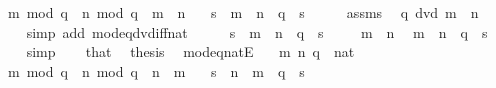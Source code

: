 \begin{isabellebody}
\ \ \ {\isachardoublequoteopen}m\ mod\ q\ {\isacharequal}{\kern0pt}\ n\ mod\ q{\isachardoublequoteclose}\ \ {\isachardoublequoteopen}m\ {\isasymge}\ n{\isachardoublequoteclose}\isanewline
\ \ \ s\ \ {\isachardoublequoteopen}m\ {\isacharequal}{\kern0pt}\ n\ {\isacharplus}{\kern0pt}\ q\ {\isacharasterisk}{\kern0pt}\ s{\isachardoublequoteclose}\isanewline
%
\isadelimproof
%
\endisadelimproof
%
\isatagproof
{}\isamarkupfalse%
\ {\isacharminus}{\kern0pt}\isanewline
\ \ \isamarkupfalse%
\ assms\ \isamarkupfalse%
\ {\isachardoublequoteopen}q\ dvd\ m\ {\isacharminus}{\kern0pt}\ n{\isachardoublequoteclose}\isanewline
\ \ \ \ \isamarkupfalse%
\ {\isacharparenleft}{\kern0pt}simp\ add{\isacharcolon}{\kern0pt}\ mod{\isacharunderscore}{\kern0pt}eq{\isacharunderscore}{\kern0pt}dvd{\isacharunderscore}{\kern0pt}iff{\isacharunderscore}{\kern0pt}nat{\isacharparenright}{\kern0pt}\isanewline
\ \ \isamarkupfalse%
\ \isamarkupfalse%
\ s\ \ {\isachardoublequoteopen}m\ {\isacharminus}{\kern0pt}\ n\ {\isacharequal}{\kern0pt}\ q\ {\isacharasterisk}{\kern0pt}\ s{\isachardoublequoteclose}\ \isacommand{{\isachardot}{\kern0pt}{\isachardot}{\kern0pt}}\isamarkupfalse%
\isanewline
\ \ \isamarkupfalse%
\ {\isacartoucheopen}m\ {\isasymge}\ n{\isacartoucheclose}\ \isamarkupfalse%
\ {\isachardoublequoteopen}m\ {\isacharequal}{\kern0pt}\ n\ {\isacharplus}{\kern0pt}\ q\ {\isacharasterisk}{\kern0pt}\ s{\isachardoublequoteclose}\isanewline
\ \ \ \ \isamarkupfalse%
\ simp\isanewline
\ \ \isamarkupfalse%
\ that\ \isamarkupfalse%
\ thesis\ \isacommand{{\isachardot}{\kern0pt}}\isamarkupfalse%
\isanewline
{}\isamarkupfalse%
%
\endisatagproof
{\isafoldproof}%
%
\isadelimproof
\isanewline
%
\endisadelimproof
\isanewline
{}\isamarkupfalse%
\ mod{\isacharunderscore}{\kern0pt}eq{\isacharunderscore}{\kern0pt}nat{}E{\isacharcolon}{\kern0pt}\isanewline
\ \ \ m\ n\ q\ {\isacharcolon}{\kern0pt}{\isacharcolon}{\kern0pt}\ nat\isanewline
\ \ \ {\isachardoublequoteopen}m\ mod\ q\ {\isacharequal}{\kern0pt}\ n\ mod\ q{\isachardoublequoteclose}\ \ {\isachardoublequoteopen}n\ {\isasymge}\ m{\isachardoublequoteclose}\isanewline
\ \ \ s\ \ {\isachardoublequoteopen}n\ {\isacharequal}{\kern0pt}\ m\ {\isacharplus}{\kern0pt}\ q\ {\isacharasterisk}{\kern0pt}\ s{\isachardoublequoteclose}\isanewline

\end{isabellebody}
